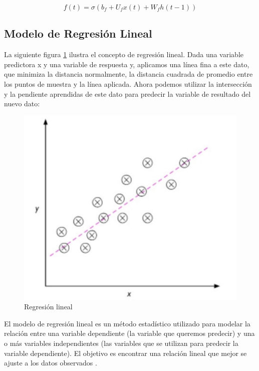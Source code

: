 \[f(t) = \sigma \left( b_f + U_f x(t) + W_f h(t-1) \right)\]

\subsection{Modelo de Regresión Lineal}

La siguiente figura \ref{fig:red_recurreente} ilustra el concepto de regresión
lineal. Dada una variable predictora x y una variable de respuesta y, aplicamos
una línea fina a este dato, que minimiza la distancia normalmente, la distancia
cuadrada de promedio entre los puntos de muestra y la línea aplicada. Ahora
podemos utilizar la intersección y la pendiente aprendidas de este dato para
predecir la variable de resultado del nuevo dato\cite{mirjalili2020python}:
\begin{figure}[H]
  \begin{center}
    \includegraphics[scale=0.40]{./grafico_regresion.png}
    \caption{Regresión lineal}
    \label{fig:red_recurreente}
  \end{center}
\end{figure}

El modelo de regresión lineal es un método estadístico utilizado para modelar
la relación entre una variable dependiente (la variable que queremos predecir)
y una o más variables independientes (las variables que se utilizan para
predecir la variable dependiente). El objetivo es encontrar una relación lineal
que mejor se ajuste a los datos observados \cite{sepulveda2023analisis}.

